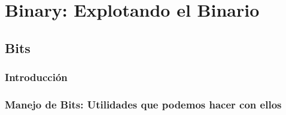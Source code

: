 \documentclass[12pt, fleqn]{report}                             %
\theoremstyle{break}                                            %
\begin{document}
    \chapter{Binary: Explotando el Binario}

        \clearpage
        \section{Bits}

            \subsection{Introducción}


            \subsection{Manejo de Bits: Utilidades que podemos hacer con ellos}
\end{document}
